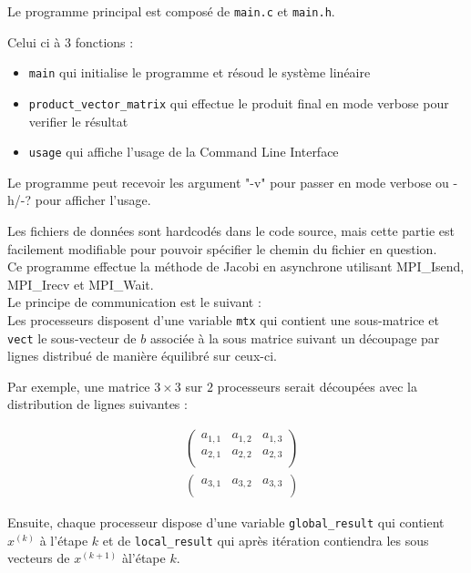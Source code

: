 \documentclass[11pt, a4paper]{article}
\begin{document}
Le programme principal est composé de \texttt{main.c} et \texttt{main.h}.

Celui ci à 3 fonctions :
\begin{itemize}
    \item \texttt{main} qui initialise le programme et résoud le système linéaire
    \item \texttt{product\_vector\_matrix} qui effectue le produit final en mode verbose pour verifier le résultat
    \item \texttt{usage} qui affiche l'usage de la Command Line Interface
\end{itemize}

Le programme peut recevoir les argument "-v" pour passer en mode verbose ou -h/-? pour afficher l'usage.

Les fichiers de données sont hardcodés dans le code source, mais cette partie est facilement modifiable pour pouvoir spécifier le chemin du fichier en question.\\

Ce programme effectue la méthode de Jacobi en asynchrone utilisant MPI\_Isend, MPI\_Irecv et MPI\_Wait.\\

Le principe de communication est le suivant :\\

Les processeurs disposent d'une variable \texttt{mtx} qui contient une sous-matrice et \texttt{vect} le sous-vecteur de $b$ associée à la sous matrice suivant un découpage par lignes distribué de manière équilibré sur ceux-ci.

Par exemple, une matrice $3 \times 3$ sur $2$ processeurs serait découpées avec la distribution de lignes suivantes :

\begin{align*}
    &\begin{pmatrix}
        a_{1,1} & a_{1,2} & a_{1,3}\\
        a_{2,1} & a_{2,2} & a_{2,3}\\
    \end{pmatrix} \\
    &\begin{pmatrix}
        a_{3,1} & a_{3,2} & a_{3,3}\\
    \end{pmatrix}
\end{align*}


Ensuite, chaque processeur dispose d'une variable \texttt{global\_result} qui contient $x^{(k)}$ à l'étape $k$ et de \texttt{local\_result} qui après itération contiendra les sous vecteurs de $x^{(k+1)}$ àl'étape $k$.\\
\end{document}
